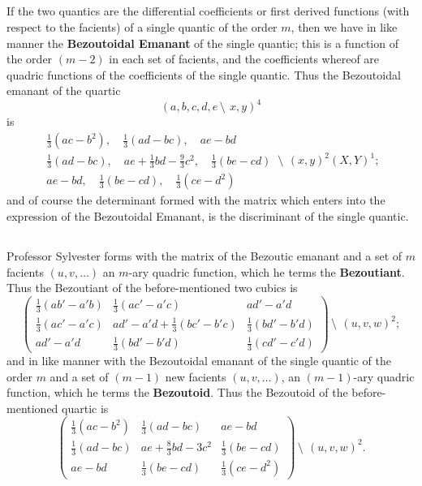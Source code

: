 \documentclass[12pt,a4paper]{article}
\begin{document}
\subsection{}

If the two quantics are the differential coefficients or first derived functions (with respect to the facients) of a single quantic of the order $m$, then we have in like manner the \textbf{Bezoutoidal Emanant} of the single quantic; this is a function of the order $(m - 2)$ in each set of facients, and the coefficients whereof are quadric functions of the coefficients of the single quantic. Thus the Bezoutoidal emanant of the quartic
\[
(a, b, c, d, e\,\setminus\!\!\:\, x, y)^4
\]
is
\[
\begin{array}{c}
\frac{1}{3}(ac - b^2), \quad \frac{1}{3}(ad - bc), \quad ae - bd \\
\frac{1}{3}(ad - bc), \quad ae + \frac{1}{3}bd - \frac{9}{3}c^2, \quad \frac{1}{3}(be - cd) \\
ae - bd, \quad \frac{1}{3}(be - cd), \quad \frac{1}{3}(ce - d^2)
\end{array}
\,\setminus\!\!\:\, (x, y)^2(X, Y)^1;
\]
and of course the determinant formed with the matrix which enters into the expression of the Bezoutoidal Emanant, is the discriminant of the single quantic.

\subsection{}

Professor Sylvester forms with the matrix of the Bezoutic emanant and a set of $m$ facients $(u, v, \ldots)$ an $m$-ary quadric function, which he terms the \textbf{Bezoutiant}. Thus the Bezoutiant of the before-mentioned two cubics is
\[
\begin{pmatrix}
\frac{1}{3}(ab' - a'b) & \frac{1}{3}(ac' - a'c) & ad' - a'd \\
\frac{1}{3}(ac' - a'c) & ad' - a'd + \frac{1}{3}(bc' - b'c) & \frac{1}{3}(bd' - b'd) \\
ad' - a'd & \frac{1}{3}(bd' - b'd) & \frac{1}{3}(cd' - c'd)
\end{pmatrix}
\,\setminus\!\!\:\, (u, v, w)^2;
\]
and in like manner with the Bezoutoidal emanant of the single quantic of the order $m$ and a set of $(m - 1)$ new facients $(u, v, \ldots)$, an $(m - 1)$-ary quadric function, which he terms the \textbf{Bezoutoid}. Thus the Bezoutoid of the before-mentioned quartic is
\[
\begin{pmatrix}
\frac{1}{3}(ac - b^2) & \frac{1}{3}(ad - bc) & ae - bd \\
\frac{1}{3}(ad - bc) & ae + \frac{8}{3}bd - 3c^2 & \frac{1}{3}(be - cd) \\
ae - bd & \frac{1}{3}(be - cd) & \frac{1}{3}(ce - d^2)
\end{pmatrix}
\,\setminus\!\!\:\, (u, v, w)^2.
\]
\end{document}

